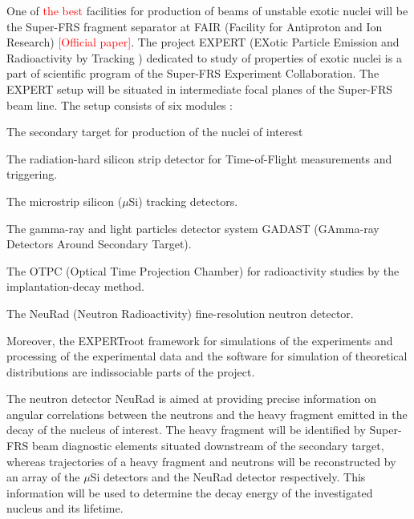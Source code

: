 \documentclass{webofc}
\newcommand{\red}[1]{\textcolor{red}{#1}}
\begin{document}
One of \red{the best} facilities for production of beams of unstable exotic nuclei will be the Super-FRS fragment separator at FAIR (Facility for Antiproton and Ion Research) \red{[Official paper]}. The project EXPERT (EXotic Particle Emission and Radioactivity by Tracking \cite{IMexpert}) dedicated to study of properties of exotic nuclei is a part of scientific program of the Super-FRS Experiment Collaboration. The EXPERT setup will be situated in intermediate focal planes of the Super-FRS beam line. The setup consists of six modules \cite{tdr}:
\begin{inparaenum}[(i)]
	\item The secondary target for production of the nuclei of interest
	\item The radiation-hard silicon strip detector for Time-of-Flight measurements and triggering.
	\item The microstrip silicon ($\mu$Si) tracking detectors.
	\item The gamma-ray and light particles detector system GADAST (GAmma-ray Detectors Around Secondary Target).
	\item The OTPC (Optical Time Projection Chamber) for radioactivity studies by the implantation-decay method.
	\item The NeuRad (Neutron Radioactivity) fine-resolution neutron detector.
\end{inparaenum}

Moreover, the EXPERTroot framework \cite{er} for simulations of the experiments and processing of the experimental data and the software for simulation of theoretical distributions are indissociable parts of the project.



The neutron detector NeuRad is aimed at providing precise information on angular correlations between the neutrons and the heavy fragment emitted in the decay of the nucleus of interest. The heavy fragment will be identified by Super-FRS beam diagnostic elements situated downstream of the secondary target, whereas trajectories of a heavy fragment and neutrons will be reconstructed by an array of the $\mu$Si detectors and the NeuRad detector respectively. This information will be used to determine the decay energy of the investigated nucleus and its lifetime.
\end{document}
